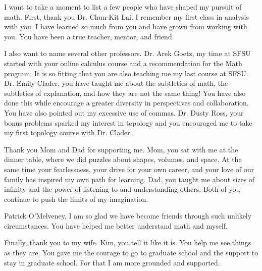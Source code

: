 

%

I want to take a moment to list a few people who have shaped my pursuit of math.  First, thank you Dr. Chun-Kit Lai.  I remember my first class in analysis with you.  I have learned so much from you and have grown from working with you.  You have been a true teacher, mentor, and friend.  

I also want to name several other professors.  Dr. Arek Goetz, my time at SFSU started with your online calculus course and a recommendation for the Math program. It is so fitting that you are also teaching me my last course at SFSU.  Dr. Emily Clader, you have taught me about the subtleties of math, the subtleties of explanation, and how they are not the same thing! You have also done this while encourage a greater diversity in perspectives and collaboration.  You have also pointed out my excessive use of commas.  Dr. Dusty Ross, your bonus problems sparked my interest in topology and you encouraged me to take my first topology course with Dr. Clader.  

Thank you Mom and Dad for supporting me.  Mom, you sat with me at the dinner table, where we did puzzles about shapes, volumes, and space.  At the same time your fearlessness, your drive for your own career, and your love of our family has inspired my own path for learning.  Dad, you taught me about sizes of infinity and the power of listening to and understanding others.  Both of you continue to push the limits of my imagination. 


Patrick O'Melveney, I am so glad we have become friends through such unlikely circumstances.  You have helped me better understand math and myself.  

Finally, thank you to my wife.  Kim, you tell it like it is.  You help me see things as they are.  You gave me the courage to go to graduate school and the support to stay in graduate school.  For that I am more grounded and supported. 



%
